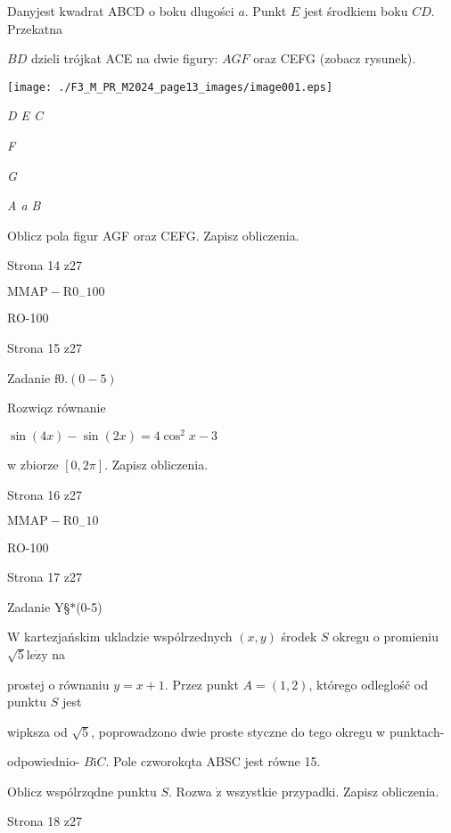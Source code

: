 \documentclass[a4paper,12pt]{article}
\begin{document}
Danyjest kwadrat ABCD o boku dlugości $a$. Punkt $E$ jest środkiem boku $CD$. Przekatna

$BD$ dzieli trójkat ACE na dwie figury: $AGF$ oraz CEFG (zobacz rysunek).
\begin{center}
\texttt{[image: ./F3\_M\_PR\_M2024\_page13\_images/image001.eps]}
\end{center}
{\it D E  C}

{\it F}

{\it G}

{\it A  a  B}

Oblicz pola figur AGF oraz CEFG. Zapisz obliczenia.

Strona 14 z27

$\mathrm{M}\mathrm{M}\mathrm{A}\mathrm{P}-\mathrm{R}0_{-}100$





RO-100

Strona 15 z27





Zadanie $\mathrm{f}0. (0-5)$

Rozwiqz równanie

$\sin(4x)-\sin(2x)=4\cos^{2}x-3$

w zbiorze $[0,2\pi]$. Zapisz obliczenia.

Strona 16 z27

$\mathrm{M}\mathrm{M}\mathrm{A}\mathrm{P}-\mathrm{R}0_{-}10$





RO-100

Strona 17 z27





Zadanie Y\S$*$(0-5)

$\mathrm{W}$ kartezjańskim ukladzie wspólrzednych $(x,y)$ środek $S$ okregu o promieniu $\sqrt{5} \mathrm{l}\mathrm{e}\dot{\mathrm{z}}\mathrm{y}$ na

prostej o równaniu $y=x+1$. Przez punkt $A=(1,2)$, którego odleglośč od punktu $S$ jest

wipksza od $\sqrt{5}$, poprowadzono dwie proste styczne do tego okregu w punktach-

odpowiednio- $B \mathrm{i} C$. Pole czworokqta ABSC jest równe 15.

Oblicz wspólrzqdne punktu $S.$ Rozwa $\dot{\mathrm{z}}$ wszystkie przypadki. Zapisz obliczenia.

Strona 18 z27
\end{document}
